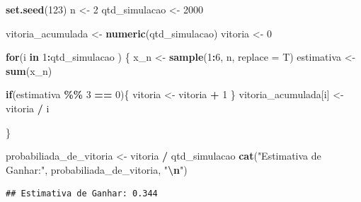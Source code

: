 \documentclass[
]{article}
\newenvironment{Shaded}{\begin{snugshade}}{\end{snugshade}}
\newcommand{\AttributeTok}[1]{\textcolor[rgb]{0.13,0.29,0.53}{#1}}
\newcommand{\ControlFlowTok}[1]{\textcolor[rgb]{0.13,0.29,0.53}{\textbf{#1}}}
\newcommand{\DecValTok}[1]{\textcolor[rgb]{0.00,0.00,0.81}{#1}}
\newcommand{\FunctionTok}[1]{\textcolor[rgb]{0.13,0.29,0.53}{\textbf{#1}}}
\newcommand{\NormalTok}[1]{#1}
\newcommand{\OtherTok}[1]{\textcolor[rgb]{0.56,0.35,0.01}{#1}}
\newcommand{\SpecialCharTok}[1]{\textcolor[rgb]{0.81,0.36,0.00}{\textbf{#1}}}
\newcommand{\StringTok}[1]{\textcolor[rgb]{0.31,0.60,0.02}{#1}}
\begin{document}
\begin{Shaded}
\begin{Highlighting}[]
\FunctionTok{set.seed}\NormalTok{(}\DecValTok{123}\NormalTok{)}
\NormalTok{n }\OtherTok{\textless{}{-}} \DecValTok{2} 
\NormalTok{qtd\_simulacao }\OtherTok{\textless{}{-}} \DecValTok{2000}

\NormalTok{vitoria\_acumulada }\OtherTok{\textless{}{-}} \FunctionTok{numeric}\NormalTok{(qtd\_simulacao)}
\NormalTok{vitoria }\OtherTok{\textless{}{-}} \DecValTok{0}

\ControlFlowTok{for}\NormalTok{(i }\ControlFlowTok{in} \DecValTok{1}\SpecialCharTok{:}\NormalTok{qtd\_simulacao ) \{}
\NormalTok{    x\_n }\OtherTok{\textless{}{-}} \FunctionTok{sample}\NormalTok{(}\DecValTok{1}\SpecialCharTok{:}\DecValTok{6}\NormalTok{, n, }\AttributeTok{replace =}\NormalTok{ T)}
\NormalTok{    estimativa }\OtherTok{\textless{}{-}} \FunctionTok{sum}\NormalTok{(x\_n)}

    \ControlFlowTok{if}\NormalTok{(estimativa }\SpecialCharTok{\%\%} \DecValTok{3} \SpecialCharTok{==} \DecValTok{0}\NormalTok{)\{}
\NormalTok{        vitoria }\OtherTok{\textless{}{-}}\NormalTok{ vitoria }\SpecialCharTok{+} \DecValTok{1}
\NormalTok{    \}}
\NormalTok{    vitoria\_acumulada[i] }\OtherTok{\textless{}{-}}\NormalTok{ vitoria }\SpecialCharTok{/}\NormalTok{ i}

\NormalTok{\}}

\NormalTok{probabiliada\_de\_vitoria }\OtherTok{\textless{}{-}}\NormalTok{ vitoria }\SpecialCharTok{/}\NormalTok{ qtd\_simulacao }
\FunctionTok{cat}\NormalTok{(}\StringTok{"Estimativa de Ganhar:"}\NormalTok{, probabiliada\_de\_vitoria, }\StringTok{"}\SpecialCharTok{\textbackslash{}n}\StringTok{"}\NormalTok{)}
\end{Highlighting}
\end{Shaded}

\begin{verbatim}
## Estimativa de Ganhar: 0.344
\end{verbatim}
\end{document}
